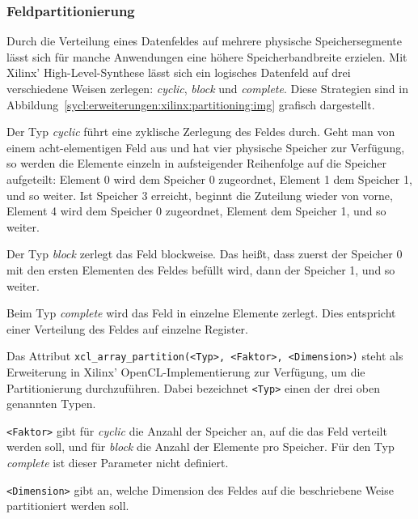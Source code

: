\subsubsection{Feldpartitionierung}
\label{sycl:erweiterungen:xilinx:partitioning}

Durch die Verteilung eines Datenfeldes auf mehrere physische Speichersegmente
lässt sich für manche Anwendungen eine höhere Speicherbandbreite erzielen.
Mit Xilinx' High-Level-Synthese lässt sich ein logisches Datenfeld auf drei
verschiedene Weisen zerlegen: \textit{cyclic}, \textit{block} und
\textit{complete}. Diese Strategien sind in
Abbildung~\ref{sycl:erweiterungen:xilinx:partitioning:img} grafisch dargestellt.
\cite[vgl.][16]{sdxpragma2019}

Der Typ \textit{cyclic} führt eine zyklische Zerlegung des Feldes durch. Geht
man von einem acht-elementigen Feld aus und hat vier physische Speicher zur
Verfügung, so werden die Elemente einzeln in aufsteigender Reihenfolge auf die
Speicher aufgeteilt: Element 0 wird dem Speicher 0 zugeordnet, Element 1 dem
Speicher 1, und so weiter. Ist Speicher 3 erreicht, beginnt die Zuteilung wieder
von vorne, Element 4 wird dem Speicher 0 zugeordnet, Element dem Speicher 1,
und so weiter. \cite[vgl.][17]{sdxpragma2019}

Der Typ \textit{block} zerlegt das Feld blockweise. Das heißt, dass zuerst der
Speicher 0 mit den ersten Elementen des Feldes befüllt wird, dann der Speicher
1, und so weiter. \cite[vgl.][17]{sdxpragma2019}

Beim Typ \textit{complete} wird das Feld in einzelne Elemente zerlegt. Dies
entspricht einer Verteilung des Feldes auf einzelne Register.
\cite[vgl.][17]{sdxpragma2019}

Das Attribut \texttt{xcl\_array\_partition(<Typ>, <Faktor>, <Dimension>)} steht
als Erweiterung in Xilinx' OpenCL-Implementierung zur Verfügung, um die
Partitionierung durchzuführen. Dabei bezeichnet \texttt{<Typ>} einen der drei
oben genannten Typen. \cite[vgl.][17]{sdxpragma2019}

\texttt{<Faktor>} gibt für \textit{cyclic} die Anzahl der Speicher an, auf die
das Feld verteilt werden soll, und für \textit{block} die Anzahl der Elemente
pro Speicher. Für den Typ \textit{complete} ist dieser Parameter nicht
definiert. \cite[vgl.][17]{sdxpragma2019}

\texttt{<Dimension>} gibt an, welche Dimension des Feldes auf die beschriebene
Weise partitioniert werden soll. \cite[vgl.][17]{sdxpragma2019}

